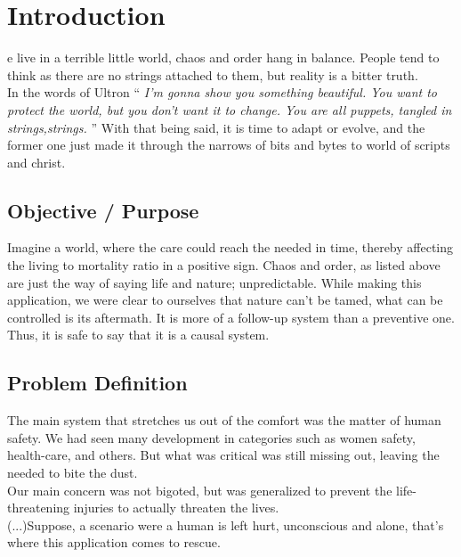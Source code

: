 %
%

\let\textcircled=\pgftextcircled

\chapter{Introduction}
\label{chap:intro}

e live in a terrible little world, chaos and order hang in balance. People tend to think as there are no strings attached to them, but reality is a bitter truth. \\
In the words of Ultron  ``\emph{ I'm gonna show you something beautiful. You want to protect the world, but you don't want it to change. You are all puppets, tangled in strings,strings. }''
With that being said, it is time to adapt or evolve, and the former one just made it through the narrows of bits and bytes to world of scripts and christ. \\



\section{Objective	/ Purpose}
\label{sec:sec01}

Imagine a world, where the care could reach the needed in time, thereby affecting the living to mortality ratio in a positive sign.
Chaos and order, as listed above are just the way of saying life and nature; unpredictable. While making this application, we were clear to ourselves that nature can't be tamed, what can be controlled is its aftermath. 
It is more of a follow-up system than a preventive one. Thus, it is safe to say that it is a causal system. \\


\section{Problem Definition}
\label{sec:sec02}

The main system that stretches us out of the comfort was the matter of human safety.
We had seen many development in categories such as women safety, health-care, and others. But what was critical was still missing out, leaving the needed to bite the dust. \\
Our main concern was not bigoted, but was generalized to prevent the life-threatening injuries to actually threaten the lives.\\
(...)Suppose, a scenario were a human is left hurt, unconscious and alone, that's where this application comes to rescue.

